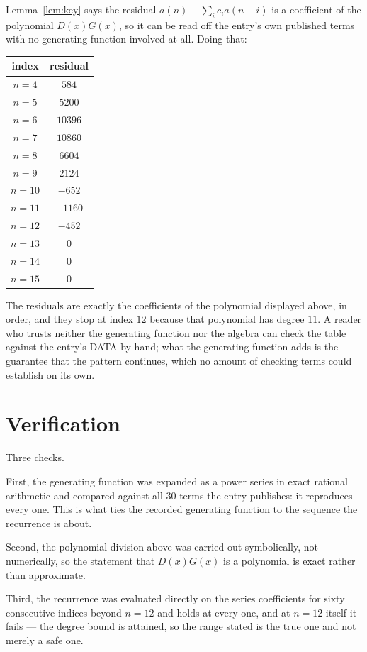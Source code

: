 \documentclass[11pt,a4paper]{article}
\theoremstyle{plain}
\theoremstyle{definition}
\begin{document}
Lemma~\ref{lem:key} says the residual $a(n)-\sum_ic_ia(n-i)$ is a coefficient of the
polynomial $D(x)G(x)$, so it can be read off the entry's own published terms with no
generating function involved at all. Doing that:
\begin{center}
\begin{tabular}{cc}
index & residual \\ \hline
$n=4$ & $584$ \\
$n=5$ & $5200$ \\
$n=6$ & $10396$ \\
$n=7$ & $10860$ \\
$n=8$ & $6604$ \\
$n=9$ & $2124$ \\
$n=10$ & $-652$ \\
$n=11$ & $-1160$ \\
$n=12$ & $-452$ \\
$n=13$ & $0$ \\
$n=14$ & $0$ \\
$n=15$ & $0$
\end{tabular}
\end{center}
The residuals are exactly the coefficients of the polynomial displayed above, in order, and
they stop at index $12$ because that polynomial has degree $11$. A reader who trusts
neither the generating function nor the algebra can check the table against the entry's DATA
by hand; what the generating function adds is the guarantee that the pattern continues, which
no amount of checking terms could establish on its own.

\section{Verification}

Three checks.

First, the generating function was expanded as a power series in exact rational arithmetic and
compared against all $30$ terms the entry publishes: it reproduces every one. This is
what ties the recorded generating function to the sequence the recurrence is about.

Second, the polynomial division above was carried out symbolically, not numerically, so the
statement that $D(x)G(x)$ is a polynomial is exact rather than approximate.

Third, the recurrence was evaluated directly on the series coefficients for sixty consecutive
indices beyond $n=12$ and holds at every one, and at $n=12$ itself it fails --- the
degree bound is attained, so the range stated is the true one and not merely a safe one.
\end{document}
